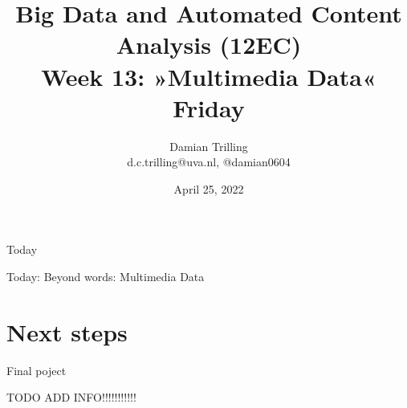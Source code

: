 

\graphicspath{{../../resources/img/}}




\title[Big Data and Automated Content Analysis]{\textbf{Big Data and Automated Content Analysis (12EC)} 
\\Week 13: »Multimedia Data«
\\Friday}
\author[Damian Trilling]{Damian Trilling\\ \footnotesize{d.c.trilling@uva.nl, @damian0604 \\}}
\date{April 25, 2022}


\begin{frame}{}
	\titlepage
\end{frame}

\begin{frame}{Today}
	\tableofcontents
\end{frame}


\begin{frame}[standout]
Today: Beyond words: Multimedia Data
\end{frame}









\section{Next steps}
\begin{frame}[standout]
Final poject

TODO ADD INFO!!!!!!!!!!!
\end{frame}


\begin{frame}
\printbibliography
\end{frame}




